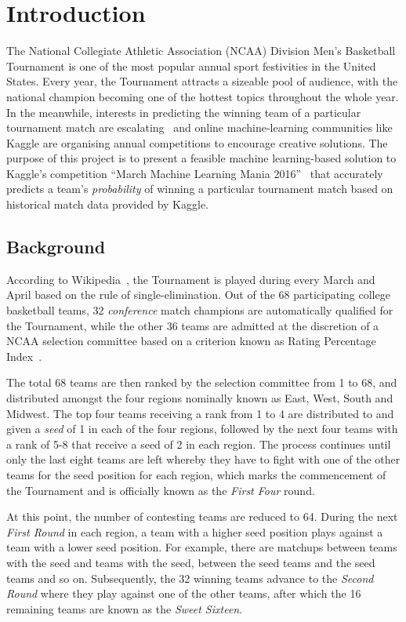 \chapter{Introduction}
The National Collegiate Athletic Association (NCAA) Division  Men's Basketball Tournament is one of the most popular annual sport festivities in the United States. Every year, the Tournament attracts a sizeable pool of audience, with the national champion becoming one of the hottest topics throughout the whole year. In the meanwhile, interests in predicting the winning team of a particular tournament match are escalating~\cite{NP17} and online machine-learning communities like Kaggle are organising annual competitions to encourage creative solutions. The purpose of this project is to present a feasible machine learning-based solution to Kaggle's competition ``March Machine Learning Mania 2016''~\cite{KG16} that accurately predicts a team's \emph{probability} of winning a particular tournament match based on historical match data provided by Kaggle. 

\section{Background}
According to Wikipedia~\cite{NCAA17}, the Tournament is played during every March and April based on the rule of single-elimination. Out of the 68 participating college basketball teams, 32 \emph{conference} match champions are automatically qualified for the Tournament, while the other 36 teams are admitted at the discretion of a NCAA selection committee based on a criterion known as Rating Percentage Index~\cite{WIK17}.

The total 68 teams are then ranked by the selection committee from 1 to 68, and distributed amongst the four regions nominally known as East, West, South and Midwest. The top four teams receiving a rank from 1 to 4 are distributed to and given a \emph{seed} of 1 in each of the four regions, followed by the next four teams with a rank of 5-8 that receive a seed of 2 in each region. The process continues until only the last eight teams are left whereby they have to fight with one of the other teams for the  seed position for each region, which marks the commencement of the Tournament and is officially known as the \emph{First Four} round. 

At this point, the number of contesting teams are reduced to 64. During the next \emph{First Round} in each region, a team with a higher seed position plays against a team with a lower seed position. For example, there are matchups between teams with the  seed and teams with the  seed, between the  seed teams and the  seed teams and so on. Subsequently, the 32 winning teams advance to the \emph{Second Round} where they play against one of the other teams, after which the 16 remaining teams are known as the \emph{Sweet Sixteen}. 

